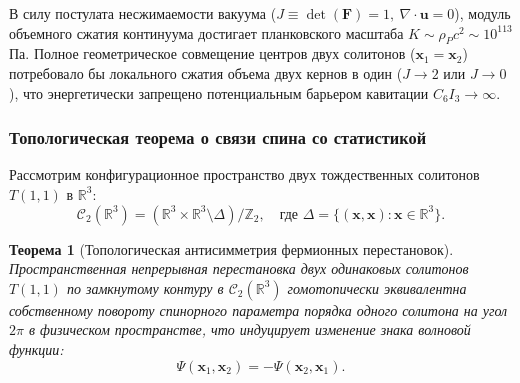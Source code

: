 \documentclass[12pt,a4paper]{article}
\newtheorem{theorem}{Теорема}
\begin{document}
	В силу постулата несжимаемости вакуума ($J \equiv \det(\mathbf{F}) = 1, \ \nabla \cdot \mathbf{u} = 0$), модуль объемного сжатия континуума достигает планковского масштаба $K \sim \rho_P c^2 \sim 10^{113}$ Па. Полное геометрическое совмещение центров двух солитонов ($\mathbf{x}_1 = \mathbf{x}_2$) потребовало бы локального сжатия объема двух кернов в один ($J \to 2$ или $J \to 0$), что энергетически запрещено потенциальным барьером кавитации $C_6 I_3 \to \infty$.
	
	\subsubsection{Топологическая теорема о связи спина со статистикой}
	Рассмотрим конфигурационное пространство двух тождественных солитонов $T(1,1)$ в $\mathbb{R}^3$:
	\begin{equation}
		\mathcal{C}_2(\mathbb{R}^3) = \left( \mathbb{R}^3 \times \mathbb{R}^3 \setminus \Delta \right) / \mathbb{Z}_2, \quad \text{где } \Delta = \{(\mathbf{x}, \mathbf{x}) : \mathbf{x} \in \mathbb{R}^3\}.
	\end{equation}
	
	\begin{theorem}[Топологическая антисимметрия фермионных перестановок]
		Пространственная непрерывная перестановка двух одинаковых солитонов $T(1,1)$ по замкнутому контуру в $\mathcal{C}_2(\mathbb{R}^3)$ гомотопически эквивалентна собственному повороту спинорного параметра порядка одного солитона на угол $2\pi$ в физическом пространстве, что индуцирует изменение знака волновой функции:
		\begin{equation}
			\Psi(\mathbf{x}_1, \mathbf{x}_2) = -\Psi(\mathbf{x}_2, \mathbf{x}_1).
		\end{equation}
	\end{theorem}
	
\end{document}
